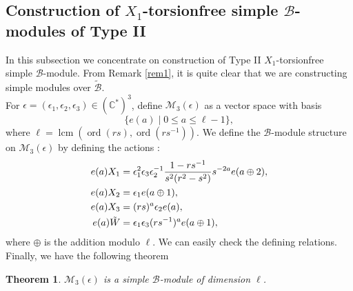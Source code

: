 \documentclass[12 pt,reqno]{amsart}
\numberwithin{equation}{section}
\DeclareMathOperator{\ord}{ord}
\newtheorem{thm}{Theorem}[section]
\theoremstyle{definition}
\theoremstyle{definition}
\theoremstyle{remark}
\theoremstyle{remark}
\begin{document}
 \subsection{\texorpdfstring{ Construction of $X_1$-torsionfree simple $\mathcal{B}$-modules of Type II}{}}
 In this subsection we concentrate on construction of Type II $X_1$-torsionfree simple $\mathcal{B}$-module. From Remark \ref{rem1}, it is quite clear that we are constructing simple modules over $\mathcal{\tilde{B}}$.\\
For $ \epsilon = (\epsilon_1, \epsilon_2, \epsilon_3) \in (\mathbb{C}^*)^3$, define $ \mathcal{M}_3(\epsilon) $ as a vector space with basis  
$$
    \{ e(a) \mid 0 \leq a \leq \ell - 1\},
$$ where $\ell=\operatorname{lcm}\left(\ord(rs),\ord(rs^{-1})\right)$. We define the $ \mathcal{B} $-module structure on $ \mathcal{M}_3(\epsilon) $ by defining the actions :
\begin{align}\label{Eq5.11}
e(a)X_1&=\epsilon_1^2\epsilon_3\epsilon_2^{-1}\displaystyle\frac{1-rs^{-1}}{s^2(r^2-s^2)}s^{-2a}e(a\oplus2),\\ \label{Eq5.12}
e(a)X_2&=\epsilon_1e(a\oplus1),\\ \label{Eq5.13}
    e(a)X_3&=(rs)^a\epsilon_2e(a),\\
    e(a)\tilde{W}&=\epsilon_1\epsilon_3(rs^{-1})^ae(a\oplus1)\notag,
\end{align} where $\oplus$ is the addition modulo $\ell$. We can easily check the defining relations. Finally, we have the following theorem
\begin{thm}\label{dim3}
    $\mathcal{M}_3(\epsilon)$ is a simple $\mathcal{B}$-module of dimension $\ell$.
\end{thm}
\end{document}
